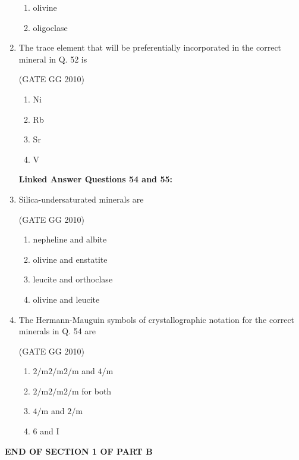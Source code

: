 \documentclass[journal]{IEEEtran}
\begin{document}
\begin{enumerate}
\begin{multicols}{4}
\begin{enumerate}
 \item olivine

 \item oligoclase

\end{enumerate}
\end{multicols}

\item The trace element that will be preferentially incorporated in the correct mineral in Q. 52 is

\hfill (GATE GG 2010) 
\begin{multicols}{4}

\begin{enumerate}
    \item Ni

\item Rb

\item Sr

\item V
\end{enumerate}
\end{multicols}

\textbf{Linked Answer Questions 54 and 55:}
\item Silica-undersaturated minerals are

\hfill (GATE GG 2010) 
\begin{multicols}{2}

\begin{enumerate}
    \item nepheline and albite

\item  olivine and enstatite

\item leucite and orthoclase

\item olivine and leucite

\end{enumerate}
 \end{multicols}
 
\item The Hermann-Mauguin symbols of crystallographic notation for the correct minerals in Q. 54 are

\hfill (GATE GG 2010) 
\begin{multicols}{2}

\begin{enumerate}
    \item $2/ \text{m}2/ \text{m}2/ \text{m}$ and $4/ \text{m}$
    \item $2/ \text{m}2/ \text{m}2/ \text{m}$ for both
    \item $4/ \text{m}$ and  $2/ \text{m}$
    \item $6$ and I
    
\end{enumerate}
\end{multicols}
\end{enumerate}
\textbf{END OF SECTION 1 OF PART B}
\end{document}
